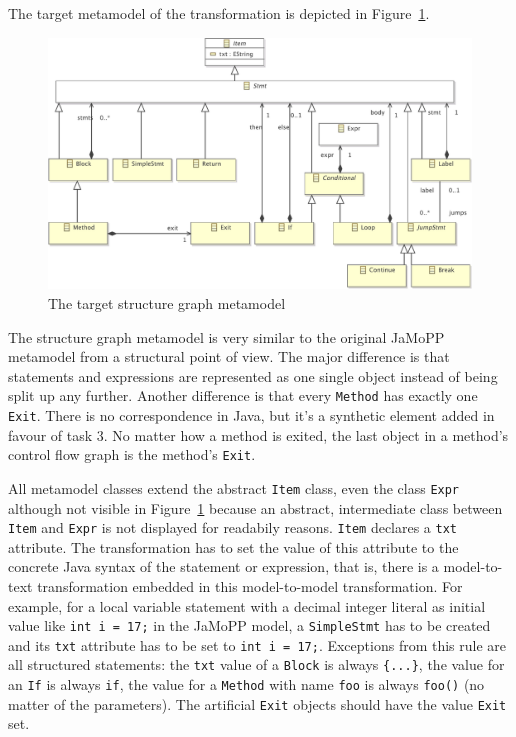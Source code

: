 \documentclass[11pt]{article}
\begin{document}
The target metamodel of the transformation is depicted in
Figure~\ref{fig:structure-graph-mm}.

\begin{figure}[h!]
  \centering
  \includegraphics[width=\linewidth]{../metamodel/StructureGraph}
  \caption{The target structure graph metamodel}
  \label{fig:structure-graph-mm}
\end{figure}

The structure graph metamodel is very similar to the original JaMoPP metamodel
from a structural point of view.  The major difference is that statements and
expressions are represented as one single object instead of being split up any
further.  Another difference is that every \verb|Method| has exactly one
\verb|Exit|.  There is no correspondence in Java, but it's a synthetic element
added in favour of task 3.  No matter how a method is exited, the last object
in a method's control flow graph is the method's \verb|Exit|.

All metamodel classes extend the abstract \verb|Item| class, even the class
\verb|Expr| although not visible in Figure~\ref{fig:structure-graph-mm} because
an abstract, intermediate class between \verb|Item| and \verb|Expr| is not
displayed for readabily reasons.  \verb|Item| declares a \verb|txt| attribute.
The transformation has to set the value of this attribute to the concrete Java
syntax of the statement or expression, that is, there is a model-to-text
transformation embedded in this model-to-model transformation.  For example,
for a local variable statement with a decimal integer literal as initial value
like \verb|int i = 17;| in the JaMoPP model, a \verb|SimpleStmt| has to be
created and its \verb|txt| attribute has to be set to \verb|int i = 17;|.
Exceptions from this rule are all structured statements: the \verb|txt| value
of a \verb|Block| is always \verb|{...}|, the value for an \verb|If| is always
\verb|if|, the value for a \verb|Method| with name \verb|foo| is always
\verb|foo()| (no matter of the parameters).  The artificial \verb|Exit| objects
should have the value \verb|Exit| set.
\end{document}
